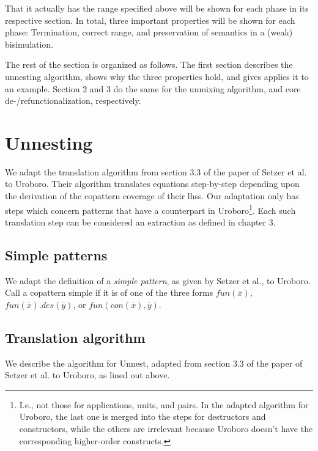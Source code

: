 That it actually has the range specified above will be shown for each phase in its respective section. In total, three important properties will be shown for each phase: Termination, correct range, and preservation of semantics in a (weak) bisimulation.

The rest of the section is organized as follows. The first section describes the unnesting algorithm, shows why the three properties hold, and gives applies it to an example. Section 2 and 3 do the same for the unmixing algorithm, and core de-/refunctionalization, respectively.

\section{Unnesting}

We adapt the translation algorithm from section 3.3 of the paper of Setzer et al. to Uroboro. Their algorithm translates equations step-by-step depending upon the derivation of the copattern coverage of their lhss. Our adaptation only has steps which concern patterns that have a counterpart in Uroboro\footnote{I.e., not those for applications, units, and pairs. In the adapted algorithm for Uroboro, the last one is merged into the steps for destructors and constructors, while the others are irrelevant because Uroboro doesn't have the corresponding higher-order constructs.}. Each such translation step can be considered an extraction as defined in chapter 3.

\subsection{Simple patterns}

We adapt the definition of a \textit{simple pattern}, as given by Setzer et al., to Uroboro. Call a copattern simple if it is of one of the three forms $fun(\overline{x})$, $fun(\overline{x}).des(\overline{y})$, or $fun(con(\overline{x}), \overline{y})$.

\subsection{Translation algorithm}

We describe the algorithm for \textsf{Unnest}, adapted from section 3.3 of the paper of Setzer et al. to Uroboro, as lined out above.


